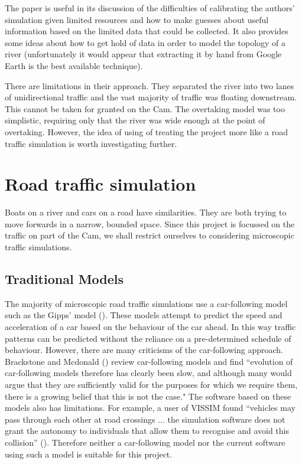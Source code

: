   The paper is useful in its discussion of the difficulties of calibrating
  the authors' simulation given limited resources and how to make guesses
  about useful information based on the limited data that could be
  collected. It also provides some ideas about how to get hold of data
  in order to model the topology of a river (unfortunately it would
  appear that extracting it by hand from Google Earth is the best available
  technique). 
  
  There are limitations in their approach. They 
  separated the river into two lanes of unidirectional traffic and the
  vast majority of traffic was floating downstream. This cannot be taken for granted on the Cam. The overtaking model was too simplistic, requiring only that the river was wide enough at the point of overtaking.
  However, the idea of using of treating the project more like a road traffic simulation is worth investigating further.
  
  \section{Road traffic simulation}
    Boats on a river and cars on a road have similarities. They are both trying to move forwards in a narrow, bounded space. Since this project is focussed on the traffic on part of the Cam, we shall restrict ourselves to considering microscopic traffic simulations.
    
    \subsection{Traditional Models}
    The majority of microscopic road traffic simulations use a car-following model such as the Gipps' model (\cite{Gipps1981}). These models attempt to predict the speed and acceleration of a car based on the behaviour of the car ahead. In this way traffic patterns can be predicted without the reliance on a pre-determined schedule of behaviour. However, there are many criticisms of the car-following approach. Brackstone and Mcdonald (\cite{Brackstone2000}) review car-following models and find ``evolution of car-following models therefore has clearly been slow, and although many would argue that they are sufficiently valid for the purposes for which we require them, there is a growing belief that this is not the case." The software based on these models also has limitations. For example, a user of VISSIM found ``vehicles may pass through each other at road crossings ... the simulation software does not grant the autonomy to individuals that allow them to recognise and avoid this collision'' (\cite{Manley}). Therefore neither a car-following model nor the current software using such a model is suitable for this project.
      
